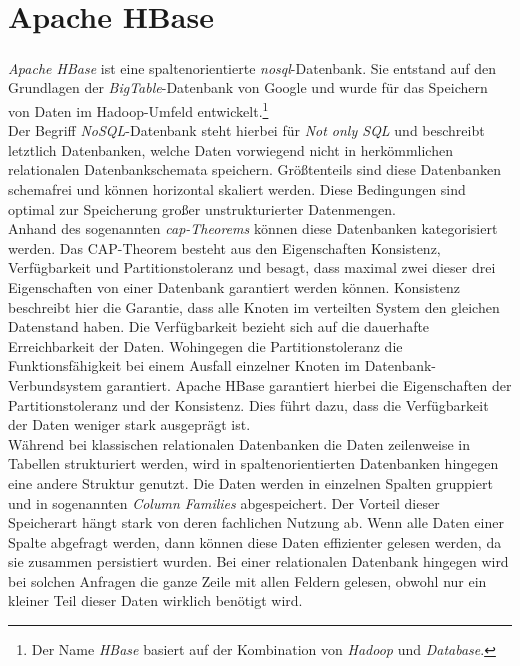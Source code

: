 \section{Apache HBase}
\label{sec:theory_hbase}
\textit{Apache HBase\textsuperscript{\textregistered}} ist eine spaltenorientierte \textit{\acrshort{nosql}}-Datenbank. Sie entstand auf den Grundlagen der \textit{BigTable}-Datenbank von Google und wurde für das Speichern von Daten im Hadoop-Umfeld entwickelt.\footnote{Der Name \textit{HBase} basiert auf der Kombination von \textit{Hadoop} und \textit{Database}.}\\
Der Begriff \textit{NoSQL}-Datenbank steht hierbei für \textit{Not only SQL} und beschreibt letztlich Datenbanken, welche Daten vorwiegend nicht in herkömmlichen relationalen Datenbankschemata speichern. Größtenteils sind diese Datenbanken schemafrei und können horizontal skaliert werden. Diese Bedingungen sind optimal zur Speicherung großer unstrukturierter Datenmengen.\\
Anhand des sogenannten \textit{\acrshort{cap}-Theorems} können diese Datenbanken kategorisiert werden.
Das CAP-Theorem besteht aus den Eigenschaften Konsistenz, Verfügbarkeit und Partitionstoleranz und besagt, dass maximal zwei dieser drei Eigenschaften von einer Datenbank garantiert werden können. Konsistenz beschreibt hier die Garantie, dass alle Knoten im verteilten System den gleichen Datenstand haben. Die Verfügbarkeit bezieht sich auf die dauerhafte Erreichbarkeit der Daten. Wohingegen die Partitionstoleranz die Funktionsfähigkeit bei einem Ausfall einzelner Knoten im Datenbank-Verbundsystem garantiert.
Apache HBase garantiert hierbei die Eigenschaften der Partitionstoleranz und der Konsistenz. Dies führt dazu, dass die Verfügbarkeit der Daten weniger stark ausgeprägt ist.
\cite[S. 189 ff.]{big_data_praxis}\\

\noindent
Während bei klassischen relationalen Datenbanken die Daten zeilenweise in Tabellen strukturiert werden, wird in spaltenorientierten Datenbanken hingegen eine andere Struktur genutzt. Die Daten werden in einzelnen Spalten gruppiert und in sogenannten \textit{Column Families} abgespeichert. Der Vorteil dieser Speicherart hängt stark von deren fachlichen Nutzung ab. Wenn alle Daten einer Spalte abgefragt werden, dann können diese Daten effizienter gelesen werden, da sie zusammen persistiert wurden. Bei einer relationalen Datenbank hingegen wird bei solchen Anfragen die ganze Zeile mit allen Feldern gelesen, obwohl nur ein kleiner Teil dieser Daten wirklich benötigt wird.\\

